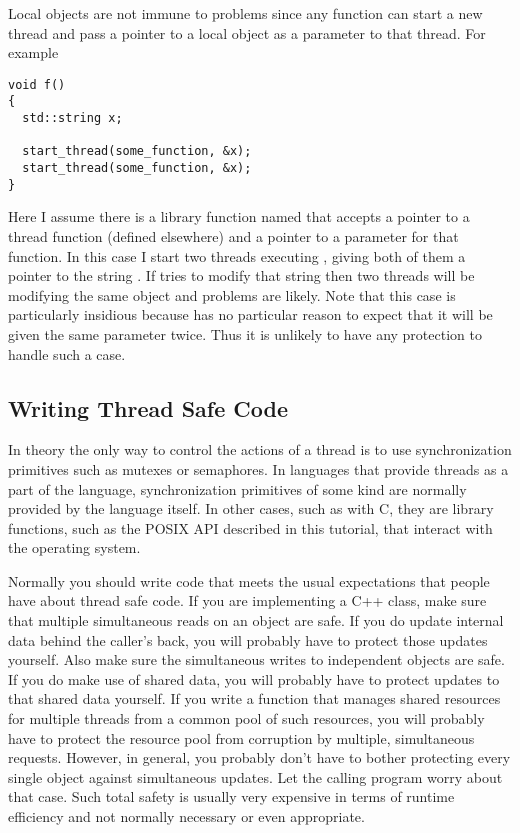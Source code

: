 Local objects are not immune to problems since any function can start a new thread and pass a
pointer to a local object as a parameter to that thread. For example

\begin{lstlisting}
void f()
{
  std::string x;

  start_thread(some_function, &x);
  start_thread(some_function, &x);
}
\end{lstlisting}

Here I assume there is a library function named  that accepts a pointer
to a thread function (defined elsewhere) and a pointer to a parameter for that function. In this
case I start two threads executing , giving both of them a pointer to
the string . If  tries to modify that string then two
threads will be modifying the same object and problems are likely. Note that this case is
particularly insidious because  has no particular reason to expect
that it will be given the same parameter twice. Thus it is unlikely to have any protection to
handle such a case.

\subsection{Writing Thread Safe Code}
\label{subsec:writing-safety}

In theory the only way to control the actions of a thread is to use synchronization primitives
such as mutexes or semaphores. In languages that provide threads as a part of the language,
synchronization primitives of some kind are normally provided by the language itself. In other
cases, such as with C, they are library functions, such as the POSIX API described in this
tutorial, that interact with the operating system.

Normally you should write code that meets the usual expectations that people have about thread
safe code. If you are implementing a C++ class, make sure that multiple simultaneous reads on an
object are safe. If you do update internal data behind the caller's back, you will probably have
to protect those updates yourself. Also make sure the simultaneous writes to independent objects
are safe. If you do make use of shared data, you will probably have to protect updates to that
shared data yourself. If you write a function that manages shared resources for multiple threads
from a common pool of such resources, you will probably have to protect the resource pool from
corruption by multiple, simultaneous requests. However, in general, you probably don't have to
bother protecting every single object against simultaneous updates. Let the calling program
worry about that case. Such total safety is usually very expensive in terms of runtime
efficiency and not normally necessary or even appropriate.

